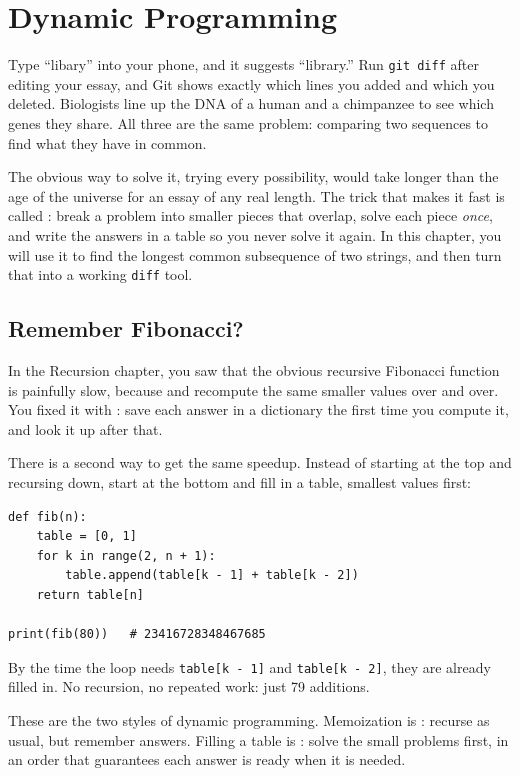 \chapter{Dynamic Programming}

Type ``libary'' into your phone, and it suggests ``library.'' Run \verb|git diff| after editing your
essay, and Git shows exactly which lines you added and which you deleted. Biologists line up the DNA of
a human and a chimpanzee to see which genes they share. All three are the same problem: comparing two
sequences to find what they have in common.

The obvious way to solve it, trying every possibility, would take longer than the age of the universe
for an essay of any real length. The trick that makes it fast is called :
break a problem into smaller pieces that overlap, solve each piece \emph{once}, and write the answers in
a table so you never solve it again. In this chapter, you will use it to find the longest common
subsequence of two strings, and then turn that into a working \verb|diff| tool.

\section{Remember Fibonacci?}
In the Recursion chapter, you saw that the obvious recursive Fibonacci function is painfully slow,
because  and  recompute the same smaller values over and
over. You fixed it with : save each answer in a dictionary the first time you
compute it, and look it up after that.

There is a second way to get the same speedup. Instead of starting at the top and recursing down, start
at the bottom and fill in a table, smallest values first:

\begin{verbatim}
def fib(n):
    table = [0, 1]
    for k in range(2, n + 1):
        table.append(table[k - 1] + table[k - 2])
    return table[n]

print(fib(80))   # 23416728348467685
\end{verbatim}

By the time the loop needs \verb|table[k - 1]| and \verb|table[k - 2]|, they are already filled in. No
recursion, no repeated work: just 79 additions.

These are the two styles of dynamic programming. Memoization is : recurse as usual, but
remember answers. Filling a table is : solve the small problems first, in an order that
guarantees each answer is ready when it is needed.

